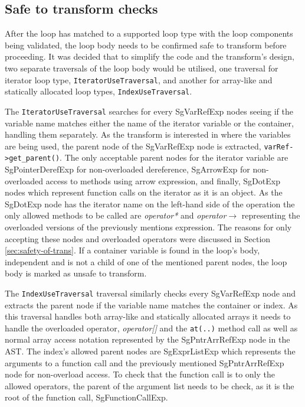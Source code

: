 \documentclass[bsc,frontabs,singlespacing,twoside,parskip,deptreport]{infthesis}
\begin{document}
\subsection{Safe to transform checks}

After the loop has matched to a supported loop type with the loop components being validated, the loop body needs to be confirmed safe to transform before proceeding. It was decided that to simplify the code and the transform's design, two separate traversals of the loop body would be utilised, one traversal for iterator loop type, \texttt{IteratorUseTraversal}, and another for array-like and statically allocated loop types, \texttt{IndexUseTraversal}. 

The \texttt{IteratorUseTraversal} searches for every SgVarRefExp nodes seeing if the variable name matches either the name of the iterator variable or the container, handling them separately. As the transform is interested in where the variables are being used, the parent node of the SgVarRefExp node is extracted, \texttt{varRef->get\_parent()}. The only acceptable parent nodes for the iterator variable are SgPointerDerefExp for non-overloaded dereference, SgArrowExp for non-overloaded access to methods using arrow expression, and finally, SgDotExp nodes which represent function calls on the iterator as it is an object. As the SgDotExp node has the iterator name on the left-hand side of the operation the only allowed methods to be called are \textit{operator*} and \textit{operator$\rightarrow$} representing the overloaded versions of the previously mentions expression. The reasons for only accepting these nodes and overloaded operators were discussed in Section \ref{sec:safety-of-trans}. If a container variable is found in the loop's body, independent and is not a child of one of the mentioned parent nodes, the loop body is marked as unsafe to transform.

The \texttt{IndexUseTraversal} traversal similarly checks every SgVarRefExp node and extracts the parent node if the variable name matches the container or index. As this traversal handles both array-like and statically allocated arrays it needs to handle the overloaded operator, \textit{operator[]} and the \texttt{at(..)} method call as well as normal array access notation represented by the SgPntrArrRefExp node in the AST. The index's allowed parent nodes are SgExprListExp which represents the arguments to a function call and the previously mentioned SgPntrArrRefExp node for non-overload access. To check that the function call is to only the allowed operators, the parent of the argument list needs to be check, as it is the root of the function call, SgFunctionCallExp.
\end{document}
